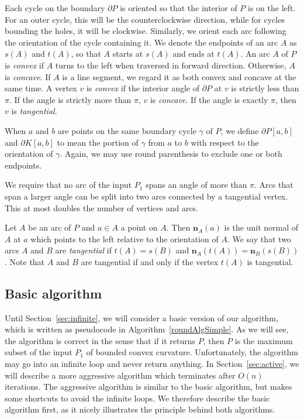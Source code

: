 \documentclass{article}
\newcommand{\PP}{P}
\newcommand{\KO}{K}
\newcommand{\nn}{\mathbf n}
\newcommand{\start}{s}
\newcommand{\terminal}{t}
\newcommand{\arcA}{A}
\newcommand{\arcB}{B}
\begin{document}
Each cycle on the boundary $\partial\PP$ is oriented so that the interior of $\PP$ is on the left.
For an outer cycle, this will be the counterclockwise direction, while for cycles bounding the holes, it will be clockwise.
Similarly, we orient each arc following the orientation of the cycle containing it.
We denote the endpoints of an arc $\arcA$ as $\start(\arcA)$ and $\terminal(\arcA)$, so that $\arcA$ starts at $\start(\arcA)$ and ends at $\terminal(\arcA)$.
An arc $\arcA$ of $\PP$ is \emph{convex} if $\arcA$ turns to the left when traversed in forward direction.
Otherwise, $\arcA$ is \emph{concave}.
If $\arcA$ is a line segment, we regard it as both convex and concave at the same time.
A vertex $v$ is \emph{convex} if the interior angle of $\partial\PP$ at $v$ is strictly less
than $\pi$. If the angle is strictly more than $\pi$, $v$ is \emph{concave}.
If the angle is exactly $\pi$, then $v$ is \emph{tangential}.

When $a$ and $b$ are points on the same boundary cycle $\gamma$ of $\PP$, we define $\partial\PP[a,b]$ and $\partial\KO[a,b]$ to mean the portion of $\gamma$ from $a$ to $b$ with respect to the orientation of $\gamma$.
Again, we may use round parenthesis to exclude one or both endpoints.

We require that no arc of the input $\PP_1$ spans an angle of more than $\pi$.
Arcs that span a larger angle can be split into two arcs connected by a tangential vertex.
This at most doubles the number of vertices and arcs.

Let $\arcA$ be an arc of $\PP$ and $a\in \arcA$ a point on $\arcA$. Then
$\nn_\arcA(a)$ is the unit normal of $\arcA$ at $a$ which points to the left
relative to the orientation of $\arcA$.
We say that two arcs $\arcA$ and $\arcB$ are \emph{tangential} if
$\terminal(\arcA)=\start(\arcB)$ and
$\nn_{\arcA}(\terminal(\arcA))=\nn_{\arcB}(\start(\arcB))$.
Note that $\arcA$ and $\arcB$ are tangential if and only if
the vertex $\terminal(\arcA)$ is tangential.

\subsection{Basic algorithm}

Until Section~\ref{sec:infinite}, we will consider a basic version of our algorithm, which is written as pseudocode in Algorithm~\ref{roundAlgSimple}.
As we will see, the algorithm is correct in the sense that if it returns $\PP$, then $\PP$ is the maximum subset of the input $\PP_1$ of bounded convex curvature.
Unfortunately, the algorithm may go into an infinite loop and never return anything.
In Section~\ref{sec:active}, we will describe a more aggressive algorithm which terminates after $O(n)$ iterations.
The aggressive algorithm is similar to the basic algorithm, but makes some shortcuts to avoid the infinite loops.
We therefore describe the basic algorithm first, as it nicely illustrates the principle behind both algorithms.
\end{document}
